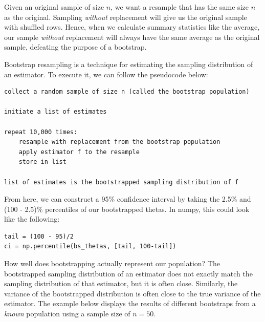 \documentclass[
  letterpaper,
  DIV=11,
  numbers=noendperiod]{scrreprt}
\begin{document}
\begin{tcolorbox}[enhanced jigsaw, titlerule=0mm, bottomtitle=1mm, arc=.35mm, colframe=quarto-callout-warning-color-frame, rightrule=.15mm, opacityback=0, opacitybacktitle=0.6, leftrule=.75mm, breakable, toprule=.15mm, colback=white, left=2mm, colbacktitle=quarto-callout-warning-color!10!white, toptitle=1mm, bottomrule=.15mm, title=\textcolor{quarto-callout-warning-color}{\faExclamationTriangle}\hspace{0.5em}{Why must we resample \emph{with replacement}?}, coltitle=black]

Given an original sample of size \(n\), we want a resample that has the
same size \(n\) as the original. Sampling \emph{without} replacement
will give us the original sample with shuffled rows. Hence, when we
calculate summary statistics like the average, our sample \emph{without}
replacement will always have the same average as the original sample,
defeating the purpose of a bootstrap.

\end{tcolorbox}

Bootstrap resampling is a technique for estimating the sampling
distribution of an estimator. To execute it, we can follow the
pseudocode below:

\begin{verbatim}
collect a random sample of size n (called the bootstrap population)

initiate a list of estimates

repeat 10,000 times:
    resample with replacement from the bootstrap population
    apply estimator f to the resample
    store in list

list of estimates is the bootstrapped sampling distribution of f
\end{verbatim}

From here, we can construct a 95\% confidence interval by taking the
2.5\% and (100 - 2.5)\% percentiles of our bootstrapped thetas. In
numpy, this could look like the following:

\begin{verbatim}
tail = (100 - 95)/2
ci = np.percentile(bs_thetas, [tail, 100-tail])
\end{verbatim}

How well does bootstrapping actually represent our population? The
bootstrapped sampling distribution of an estimator does not exactly
match the sampling distribution of that estimator, but it is often
close. Similarly, the variance of the bootstrapped distribution is often
close to the true variance of the estimator. The example below displays
the results of different bootstraps from a \emph{known} population using
a sample size of \(n=50\).
\end{document}
